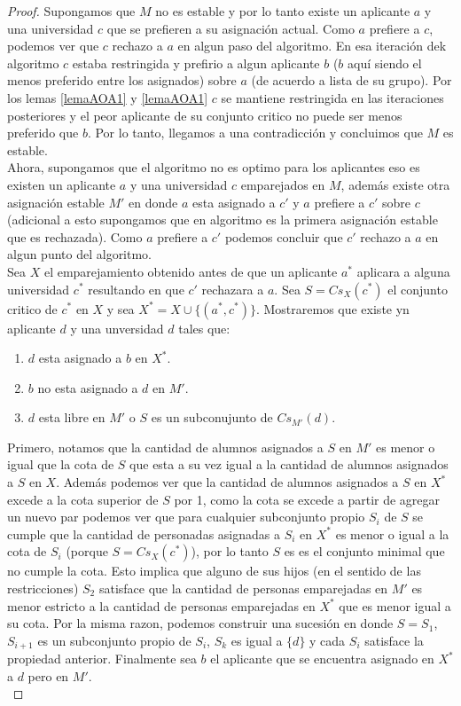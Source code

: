 \begin{proof}
Supongamos que $M$ no es estable y por lo tanto existe un aplicante $a$ y una universidad $c$ que se prefieren a su asignación actual. Como $a$ prefiere a $c$, podemos ver que $c$ rechazo a $a$ en algun paso del algoritmo. En esa iteración dek algoritmo $c$ estaba restringida y prefirio a algun aplicante $b$ ($b$ aquí siendo el menos preferido entre los asignados) sobre $a$ (de acuerdo a lista de su grupo). Por los lemas \ref{lemaAOA1} y \ref{lemaAOA1} $c$ se mantiene restringida en las iteraciones posteriores y el peor aplicante de su conjunto critico no puede ser menos preferido que $b$. Por lo tanto, llegamos a una contradicción y concluimos que $M$ es estable. \\
Ahora, supongamos que el algoritmo no es optimo para los aplicantes eso es existen un aplicante $a$ y una universidad $c$ emparejados en $M$, además existe otra asignación estable $M'$ en donde $a$ esta asignado a $c'$ y $a$ prefiere a $c'$ sobre $c$ (adicional a esto supongamos que en algoritmo es la primera asignación estable que es rechazada). Como $a$ prefiere a $c'$ podemos concluir que $c'$ rechazo a $a$ en algun punto del algoritmo. \\
Sea $X$ el emparejamiento obtenido antes de que un aplicante $a^*$ aplicara a alguna universidad $c^*$ resultando en que $c'$ rechazara a $a$. Sea $S=Cs_X(c^*)$ el conjunto critico de $c^*$ en $X$ y sea $X^*=X \cup \{(a^*,c^*)\}$. Mostraremos que existe yn aplicante $d$ y una unversidad $d$ tales que:
\begin{enumerate}
\item $d$ esta asignado a $b$ en $X^*$.
\item $b$ no esta asignado a $d$ en $M'$.
\item $d$ esta libre en $M'$ o $S$ es un subconujunto de $Cs_{M'}(d)$.
\end{enumerate}
Primero, notamos que la cantidad de alumnos asignados a $S$ en $M'$ es menor o igual que la cota de $S$ que esta a su vez igual a la cantidad de alumnos asignados a $S$ en $X$. Además podemos ver que la cantidad de alumnos asignados a $S$ en $X^*$ excede a la cota superior de $S$ por 1, como la cota se excede a partir de agregar un nuevo par podemos ver que para cualquier subconjunto propio $S_i$ de $S$ se cumple que la cantidad de personadas asignadas a $S_i$ en $X^*$ es menor o igual a la cota de $S_i$ (porque $S=Cs_X(c^*)$), por lo tanto $S$ es es el conjunto minimal que no cumple la cota. Esto implica que alguno de sus hijos (en el sentido de las restricciones) $S_2$ satisface que la cantidad de personas emparejadas en $M'$ es menor estricto a la cantidad de personas emparejadas en $X^*$ que es menor igual a su cota. Por la misma razon, podemos construir una sucesión en donde $S=S_1$, $S_{i+1}$ es un subconjunto propio de $S_i$, $S_{k}$ es igual a $\{d\}$ y cada $S_i$ satisface la propiedad anterior. Finalmente sea $b$ el aplicante que se encuentra asignado en $X^*$ a $d$ pero en $M'$. \\

\end{proof}
